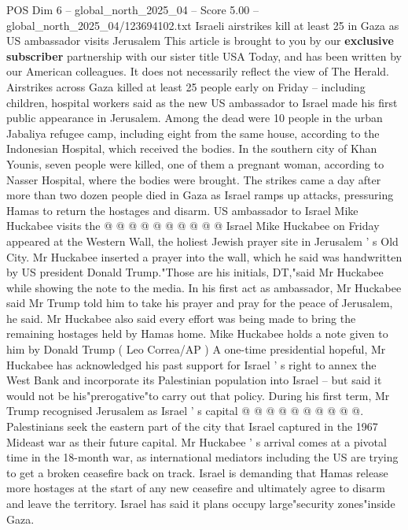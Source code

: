 \begin{textsample}{POS Dim 6 – global\_north\_2025\_04 – Score 5.00 – global\_north\_2025\_04/123694102.txt}  \label{ex:f6_pos_194}
Israeli airstrikes kill at least 25 in Gaza as US ambassador visits Jerusalem This article is brought to you by our \textbf{exclusive} \textbf{subscriber} partnership with our sister title USA Today, and has been written by our American colleagues.
It does not necessarily reflect the view of The Herald.
Airstrikes across Gaza killed at least 25 people early on Friday -- including children, hospital workers said as the new US ambassador to Israel made his first public appearance in Jerusalem.
Among the dead were 10 people in the urban Jabaliya refugee camp, including eight from the same house, according to the Indonesian Hospital, which received the bodies.
In the southern city of Khan Younis, seven people were killed, one of them a pregnant woman, according to Nasser Hospital, where the bodies were brought.
The strikes came a day after more than two dozen people died in Gaza as Israel ramps up attacks, pressuring Hamas to return the hostages and disarm.
US ambassador to Israel Mike Huckabee visits the @ @ @ @ @ @ @ @ @ @ Israel Mike Huckabee on Friday appeared at the Western Wall, the holiest Jewish prayer site in Jerusalem ' s Old City.
Mr Huckabee inserted a prayer into the wall, which he said was handwritten by US president Donald Trump."Those are his initials, DT,"said Mr Huckabee while showing the note to the media.
In his first act as ambassador, Mr Huckabee said Mr Trump told him to take his prayer and pray for the peace of Jerusalem, he said.
Mr Huckabee also said every effort was being made to bring the remaining hostages held by Hamas home.
Mike Huckabee holds a note given to him by Donald Trump ( Leo Correa/AP ) A one-time presidential hopeful, Mr Huckabee has acknowledged his past support for Israel ' s right to annex the West Bank and incorporate its Palestinian population into Israel -- but said it would not be his"prerogative"to carry out that policy.
During his first term, Mr Trump recognised Jerusalem as Israel ' s capital @ @ @ @ @ @ @ @ @ @.
Palestinians seek the eastern part of the city that Israel captured in the 1967 Mideast war as their future capital.
Mr Huckabee ' s arrival comes at a pivotal time in the 18-month war, as international mediators including the US are trying to get a broken ceasefire back on track.
Israel is demanding that Hamas release more hostages at the start of any new ceasefire and ultimately agree to disarm and leave the territory.
Israel has said it plans occupy large"security zones"inside Gaza.

\end{textsample}
